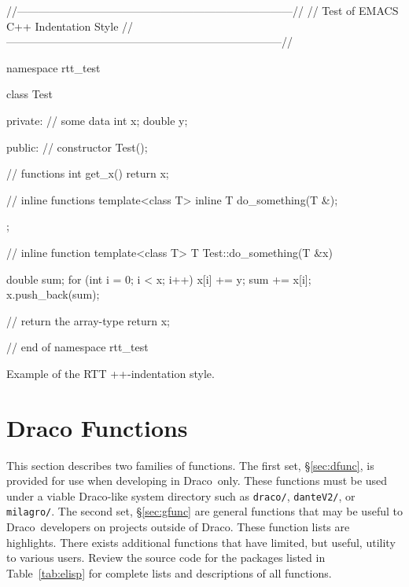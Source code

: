 \documentclass[11pt]{nmemo}
\newcommand{\comp}[1]{{\normalfont\texttt{\footnotesize{#1}}}}
\newcommand{\draco}{{\normalfont\sffamily Draco}}
\newenvironment{codeExample}
{\footnotesize 
  \VerbatimEnvironment
  \begin{SaveVerbatim}{\mycode}}%
  {\end{SaveVerbatim}%
  \noindent%
  \parashade[.950]{sharpcorners}{\gdef\outlineboxwidth{.5}%
    \UseVerbatim{\mycode}}\normalsize}
\begin{document}

\begin{cxxSampleCode}
\begin{codeExample}
//---------------------------------------------------------------------------//
// Test of EMACS C++ Indentation Style
//---------------------------------------------------------------------------//

namespace rtt_test {

class Test
{
  private:
    // some data
    int x;
    double y;
    
  public:
    // constructor
    Test();
    
    // functions
    int get_x() { return x; }
    
    // inline functions
    template<class T> inline T do_something(T &);
};

// inline function
template<class T> T Test::do_something(T &x)
{
    double sum;
    for (int i = 0; i < x; i++)
    {
        x[i] += y;
        sum += x[i];
    }
    x.push_back(sum);
    
    // return the array-type
    return x;
}

} // end of namespace rtt_test

\end{codeExample}
\caption{Example of the RTT \C++-indentation style.}
\label{codeExample:samp1}
\end{cxxSampleCode}


\section{Draco Functions}
\label{sec:func}

This section describes two families of functions.  The first set,
\S\ref{sec:dfunc}, is provided for use when developing in \draco\ 
only.  These functions must be used under a viable \draco-like system
directory such as \comp{draco/}, \comp{danteV2/}, or \comp{milagro/}.
The second set, \S\ref{sec:gfunc} are general functions that may be
useful to \draco\ developers on projects outside of \draco.  These
function lists are highlights.  There exists additional functions that
have limited, but useful, utility to various users.  Review the source
code for the packages listed in Table~\ref{tab:elisp} for complete
lists and descriptions of all functions.
\end{document}
